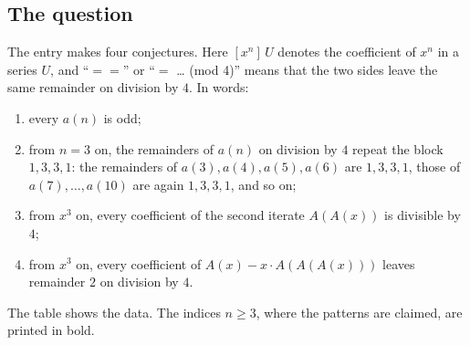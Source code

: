 \documentclass[11pt,a4paper]{article}
\theoremstyle{definition}
\theoremstyle{remark}
\begin{document}
\subsection{The question}
The entry makes four conjectures. Here $[x^n]\,U$ denotes the coefficient of $x^n$ in a series $U$, and
``$==$'' or ``$=$ \dots{} (mod 4)'' means that the two sides leave the same remainder on division by $4$. In words:
\begin{enumerate}[label=(\alph*)]
\item every $a(n)$ is odd;
\item from $n=3$ on, the remainders of $a(n)$ on division by $4$ repeat the block $1,3,3,1$: the remainders of
$a(3),a(4),a(5),a(6)$ are $1,3,3,1$, those of $a(7),\dots,a(10)$ are again $1,3,3,1$, and so on;
\item from $x^3$ on, every coefficient of the second iterate $A(A(x))$ is divisible by $4$;
\item from $x^3$ on, every coefficient of $A(x)-x\cdot A(A(A(x)))$ leaves remainder $2$ on division by $4$.
\end{enumerate}
The table shows the data. The indices $n\ge3$, where the patterns are claimed, are printed in bold.
\end{document}
